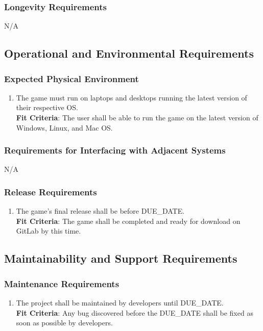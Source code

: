 \documentclass[12pt, titlepage]{article}
\begin{document}
\subsubsection{Longevity Requirements}
N/A
\subsection{Operational and Environmental Requirements}
\subsubsection{Expected Physical Environment}
\begin{enumerate}[leftmargin=1.45cm, label={OE \arabic*} ]
    \item The game must run on laptops and desktops running the latest version of their respective OS.\\
    \textbf{Fit Criteria}: The user shall be able to run the game on the latest version of Windows, Linux, and Mac OS.
\end{enumerate}

\subsubsection{Requirements for Interfacing with Adjacent Systems}
N/A

\subsubsection{Release Requirements}
\begin{enumerate}[leftmargin=1.45cm, label={OE \arabic*} ]
    \item The game's final release shall be before DUE\_DATE.\\
    \textbf{Fit Criteria}: The game shall be completed and ready for download on GitLab by this time.
\end{enumerate}

\subsection{Maintainability and Support Requirements}
\subsubsection{Maintenance Requirements}
\begin{enumerate}[leftmargin=1.45cm, label={MS \arabic*}]
    \item The project shall be maintained by developers until DUE\_DATE. \\
    \textbf{Fit Criteria}: Any bug discovered before the DUE\_DATE shall be fixed as soon as possible by developers.
\end{enumerate}
\end{document}
